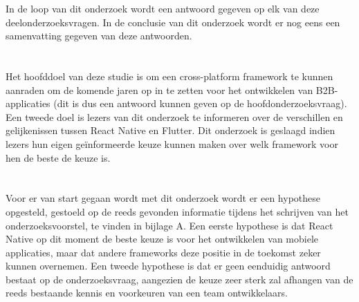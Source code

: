 In de loop van dit onderzoek wordt een antwoord gegeven op elk van deze deelonderzoeksvragen. In de conclusie van dit onderzoek wordt er nog eens een samenvatting gegeven van deze antwoorden.

\section{}
\label{sec:onderzoeksdoelstelling}


Het hoofddoel van deze studie is om een cross-platform framework te kunnen aanraden om de komende jaren op in te zetten voor het ontwikkelen van B2B-applicaties (dit is dus een antwoord kunnen geven op de hoofdonderzoeksvraag). Een tweede doel is lezers van dit onderzoek te informeren over de verschillen en gelijkenissen tussen React Native en Flutter. Dit onderzoek is geslaagd indien lezers hun eigen geïnformeerde keuze kunnen maken over welk framework voor hen de beste de keuze is.

\section{}
\label{sec:hypothese}

Voor er van start gegaan wordt met dit onderzoek wordt er een hypothese opgesteld, gestoeld op de reeds gevonden informatie tijdens het schrijven van het onderzoeksvoorstel, te vinden in bijlage A. Een eerste hypothese is dat React Native op dit moment de beste keuze is voor het ontwikkelen van mobiele applicaties, maar dat andere frameworks deze positie in de toekomst zeker kunnen overnemen. Een tweede hypothese is dat er geen eenduidig antwoord bestaat op de onderzoeksvraag, aangezien de keuze zeer sterk zal afhangen van de reeds bestaande kennis en voorkeuren van een team ontwikkelaars.

\section{}
\label{sec:opzet-bachelorproef}

